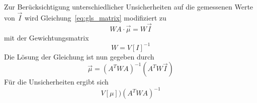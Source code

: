 Zur Berücksichtigung unterschiedlicher Unsicherheiten auf die gemessenen Werte
von $\vec{I}$ wird Gleichung~\eqref{eq:gls_matrix} modifiziert zu
\begin{equation}
  WA\cdot\vec{\mu}=W\vec{I}
\end{equation}
mit der Gewichtungsmatrix
\begin{equation}
  W=V[I]^{-1}
\end{equation}
Die Lösung der Gleichung ist nun gegeben durch
\begin{equation}
  \vec{\mu}=\left(A^TWA\right)^{-1}\left(A^TW\vec{I}\right)
\end{equation}
Für die Unsicherheiten ergibt sich
\begin{equation}
  V[\mu])\left(A^TWA\right)^{-1}
\end{equation}
